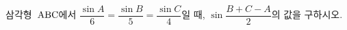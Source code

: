 삼각형~$\mathrm{ABC}$에서 $\dfrac{\sin A}{6}=\dfrac{\sin B}{5}=\dfrac{\sin C}{4}$일 때, $\sin\dfrac{B+C-A}{2}$의 값을 구하시오.
